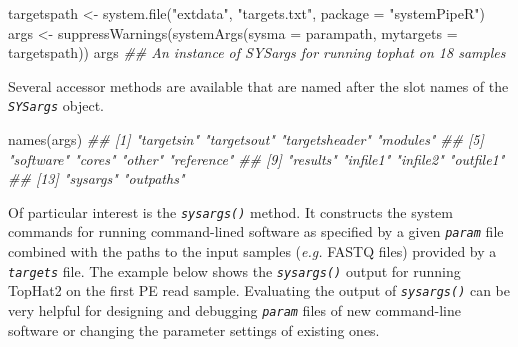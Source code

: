 \documentclass[14pt,]{article}
\newcommand{\hlstr}[1]{\textcolor[rgb]{0.251,0.627,0.251}{#1}}%
\newcommand{\hlcom}[1]{\textcolor[rgb]{0.502,0.502,0.502}{\textit{#1}}}%
\newcommand{\hlstd}[1]{\textcolor[rgb]{0.251,0.251,0.251}{#1}}%
\newenvironment{Shaded}{\begin{myshaded}}{\end{myshaded}}
\newcommand{\StringTok}[1]{\hlstr{#1}}
\newcommand{\DocumentationTok}[1]{\hlcom{#1}}
\newcommand{\OtherTok}[1]{{#1}}
\newcommand{\FunctionTok}[1]{\hlstd{#1}}
\newcommand{\AttributeTok}[1]{{#1}}
\newcommand{\NormalTok}[1]{\hlstd{#1}}
\begin{document}
\begin{Shaded}
\begin{Highlighting}[]
\NormalTok{targetspath }\OtherTok{\textless{}{-}} \FunctionTok{system.file}\NormalTok{(}\StringTok{"extdata"}\NormalTok{, }\StringTok{"targets.txt"}\NormalTok{, }\AttributeTok{package =} \StringTok{"systemPipeR"}\NormalTok{)}
\NormalTok{args }\OtherTok{\textless{}{-}} \FunctionTok{suppressWarnings}\NormalTok{(}\FunctionTok{systemArgs}\NormalTok{(}\AttributeTok{sysma =}\NormalTok{ parampath, }\AttributeTok{mytargets =}\NormalTok{ targetspath))}
\NormalTok{args}
\DocumentationTok{\#\# An instance of \textquotesingle{}SYSargs\textquotesingle{} for running \textquotesingle{}tophat\textquotesingle{} on 18 samples}
\end{Highlighting}
\end{Shaded}

Several accessor methods are available that are named after the slot names of the \emph{\texttt{SYSargs}} object.

\begin{Shaded}
\begin{Highlighting}[]
\FunctionTok{names}\NormalTok{(args)}
\DocumentationTok{\#\#  [1] "targetsin"     "targetsout"    "targetsheader" "modules"      }
\DocumentationTok{\#\#  [5] "software"      "cores"         "other"         "reference"    }
\DocumentationTok{\#\#  [9] "results"       "infile1"       "infile2"       "outfile1"     }
\DocumentationTok{\#\# [13] "sysargs"       "outpaths"}
\end{Highlighting}
\end{Shaded}

Of particular interest is the \emph{\texttt{sysargs()}} method. It constructs the system
commands for running command-lined software as specified by a given \emph{\texttt{param}}
file combined with the paths to the input samples (\emph{e.g.} FASTQ files) provided
by a \emph{\texttt{targets}} file. The example below shows the \emph{\texttt{sysargs()}} output for
running TopHat2 on the first PE read sample. Evaluating the output of
\emph{\texttt{sysargs()}} can be very helpful for designing and debugging \emph{\texttt{param}} files
of new command-line software or changing the parameter settings of existing
ones.
\end{document}
